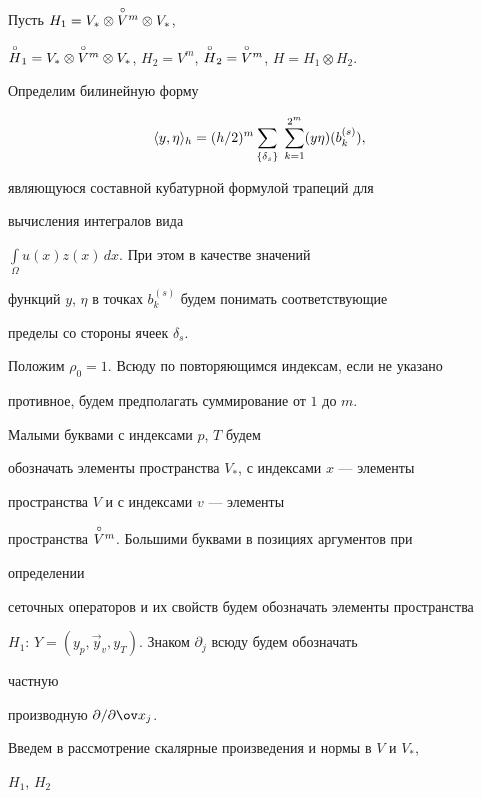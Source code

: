 Пусть $H_1=V_{*}\otimes \overset{\circ}{V}{}^m\otimes V_{*}$,


$\ZeroUp{H}_1=V_{*}\otimes \ZeroUp{V}{}^m\otimes


V_{*}$, ${H_2}=V^m$, $\ZeroUp{H}_2=\ZeroUp{V}{}^m$, $H=H_1\otimes H_2$.


Определим билинейную форму


$$


\Dual{y,\eta}=(h/2)^{m}\sum_{\{\delta_s\}}\; \sum_{k=1}^{2^m} (y 


\eta)(b_k^{(s)}),


$$


являющуюся  составной кубатурной формулой трапеций для 


вычисления интегралов вида\linebreak


$\int\limits_{\Omega}u(x)z(x)\, dx$. При этом в качестве значений


функций $y$, $\eta$ в точках $b_k^{(s)}$ будем понимать соответствующие


пределы со стороны ячеек $\delta_s$.





Положим $\rho_0=1$. Всюду по повторяющимся индексам, если не указано 


противное, будем предполагать суммирование от $1$ до $m$. 


Малыми буквами с индексами $p$, $T$ будем 


обозначать элементы пространства $V_{*}$, с индексами $x$ --- элементы


пространства $V$ и с индексами $v$ --- элементы


пространства $\overset{\circ}{V}{}^m$. Большими буквами в позициях аргументов при 


определении


сеточных операторов и их свойств будем обозначать элементы пространства


$H_1$: $Y=(y_p,\Vec y_v,y_T)$. Знаком $\partial_j$ всюду будем обозначать 


частную


производную $\partial  /\partial \ov x_j$.





Введем в рассмотрение скалярные произведения и нормы в $V$ и $V_{*}$,


$H_1$, $H_2$


